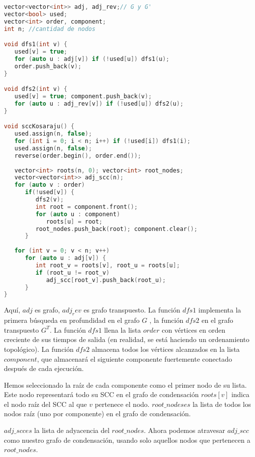\begin{lstlisting}[language=C++]
vector<vector<int>> adj, adj_rev;// G y G'
vector<bool> used;
vector<int> order, component;
int n; //cantidad de nodos

void dfs1(int v) {
   used[v] = true;
   for (auto u : adj[v]) if (!used[u]) dfs1(u);
   order.push_back(v);
}

void dfs2(int v) {
   used[v] = true; component.push_back(v);
   for (auto u : adj_rev[v]) if (!used[u]) dfs2(u);
}

void sccKosaraju() {
   used.assign(n, false);
   for (int i = 0; i < n; i++) if (!used[i]) dfs1(i);
   used.assign(n, false);
   reverse(order.begin(), order.end());
   
   vector<int> roots(n, 0); vector<int> root_nodes;
   vector<vector<int>> adj_scc(n);
   for (auto v : order) 
      if(!used[v]) {
         dfs2(v);
         int root = component.front();
         for (auto u : component)
            roots[u] = root; 
         root_nodes.push_back(root); component.clear();
      }
   
   for (int v = 0; v < n; v++)
      for (auto u : adj[v]) {
         int root_v = roots[v], root_u = roots[u];
         if (root_u != root_v)
            adj_scc[root_v].push_back(root_u);
      }
}
\end{lstlisting}

Aquí, $adj$ es grafo, $adj_rev$ es grafo transpuesto. La función $dfs1$ implementa la primera búsqueda en profundidad en el grafo $G$ , la función $dfs2$ en el grafo transpuesto $G^T$. La función $dfs1$ llena la lista $order$ con vértices en orden creciente de sus tiempos de salida (en realidad, se está haciendo un ordenamiento topológico). La función $dfs2$ almacena todos los vértices alcanzados en la lista $component$, que almacenará el siguiente componente fuertemente conectado después de cada ejecución.

Hemos seleccionado la raíz de cada componente como el primer nodo de su lista. Este nodo representará todo su SCC en el grafo de condensación $roots[v]$ indica el nodo raíz del SCC al que $v$ pertenece el nodo. $root\_nodeses$ la lista de todos los nodos raíz (uno por componente) en el grafo de condensación.

$adj\_scces$ la lista de adyacencia del $root\_nodes$. Ahora podemos atravesar $adj\_scc$ como nuestro grafo de condensación, usando solo aquellos nodos que pertenecen a $root\_nodes$.